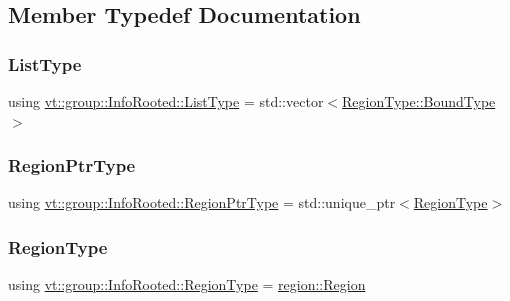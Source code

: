 \subsection{Member Typedef Documentation}
\mbox{\label{structvt_1_1group_1_1_info_rooted_aab859fcabc7b137db51af4af86ebe56d}} 
\subsubsection{\texorpdfstring{List\+Type}{ListType}}
{\footnotesize\ttfamily using \hyperlink{structvt_1_1group_1_1_info_rooted_aab859fcabc7b137db51af4af86ebe56d}{vt\+::group\+::\+Info\+Rooted\+::\+List\+Type} =  std\+::vector$<$\hyperlink{structvt_1_1group_1_1region_1_1_region_abf426ff85bed72c1c6524fad6a9f1751}{Region\+Type\+::\+Bound\+Type}$>$}

\mbox{\label{structvt_1_1group_1_1_info_rooted_a127ac5ebcfb9871621c1f66dba481c0b}} 
\subsubsection{\texorpdfstring{Region\+Ptr\+Type}{RegionPtrType}}
{\footnotesize\ttfamily using \hyperlink{structvt_1_1group_1_1_info_rooted_a127ac5ebcfb9871621c1f66dba481c0b}{vt\+::group\+::\+Info\+Rooted\+::\+Region\+Ptr\+Type} =  std\+::unique\+\_\+ptr$<$\hyperlink{structvt_1_1group_1_1_info_rooted_a9d665331fedfc780eeb0efe16372e104}{Region\+Type}$>$}

\mbox{\label{structvt_1_1group_1_1_info_rooted_a9d665331fedfc780eeb0efe16372e104}} 
\subsubsection{\texorpdfstring{Region\+Type}{RegionType}}
{\footnotesize\ttfamily using \hyperlink{structvt_1_1group_1_1_info_rooted_a9d665331fedfc780eeb0efe16372e104}{vt\+::group\+::\+Info\+Rooted\+::\+Region\+Type} =  \hyperlink{structvt_1_1group_1_1region_1_1_region}{region\+::\+Region}}




